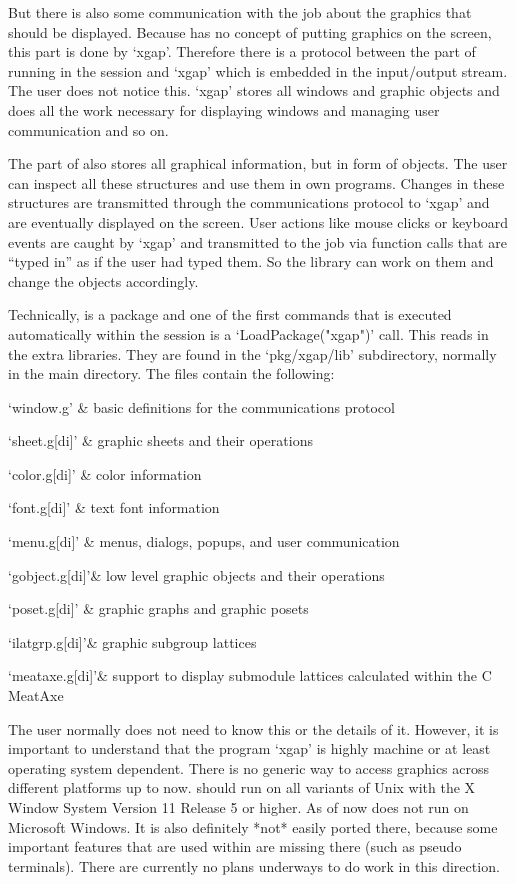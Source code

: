 But there is also some communication with the {\GAP} job about the graphics
that should be displayed. Because {\GAP} has no concept of putting graphics
on the screen, this part is done by `xgap'. Therefore there is a protocol
between the {\GAP} part of {\XGAP} running in the {\GAP} session and `xgap' 
which is embedded in the input/output stream. The user does not notice
this. `xgap' stores all windows and graphic objects and does all the work
necessary for displaying windows and managing user communication and so on.

The {\GAP} part of {\XGAP} also stores all graphical information, but in
form of {\GAP} objects. The user can inspect all these structures and use
them in own programs. Changes in these structures are transmitted through
the communications protocol to `xgap' and are eventually displayed on the
screen. User actions like mouse clicks or keyboard events are caught by
`xgap' and transmitted to the {\GAP} job via function calls that are
``typed in'' as if the user had typed them. So the library can work on them 
and change the {\GAP} objects accordingly.

Technically, {\XGAP} is a package and one of the first commands that
is executed automatically within the {\GAP} session is a
`LoadPackage("xgap")' call. This reads in the extra {\XGAP}
libraries. They are found in the `pkg/xgap/lib' subdirectory, normally in the
main {\GAP} directory. The files contain the following:

\beginitems
`window.g' & basic definitions for the communications protocol

`sheet.g[di]' & graphic sheets and their operations 

`color.g[di]' & color information

`font.g[di]'  & text font information

`menu.g[di]'  & menus, dialogs, popups, and user communication

`gobject.g[di]'& low level graphic objects and their operations

`poset.g[di]' & graphic graphs and graphic posets

`ilatgrp.g[di]'& graphic subgroup lattices

`meataxe.g[di]'& support to display submodule lattices calculated within
the C MeatAxe
\enditems

The user normally does not need to know this or the details of it. However, 
it is important to understand that the program `xgap' is highly machine or
at least operating system dependent. There is no generic way to access
graphics across different platforms up to now. {\XGAP} should run on all
variants of Unix with the X Window System Version 11 Release 5 or
higher. As of now {\XGAP} does not run on Microsoft Windows. It is 
also definitely *not* easily ported there, because some important features
that are used within {\XGAP} are missing there (such as pseudo terminals).
There are currently no plans underways to do work in this direction.

